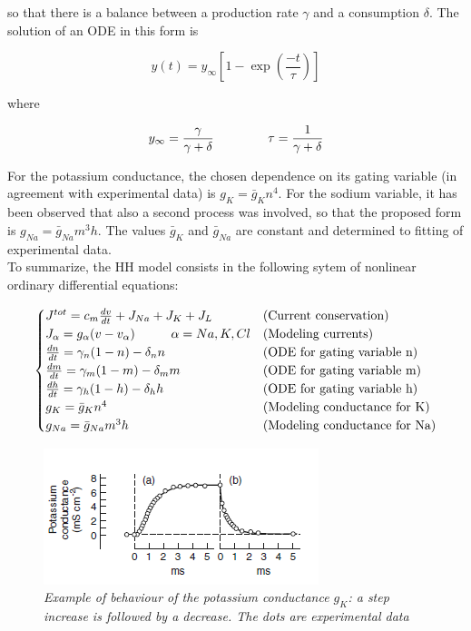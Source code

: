 \documentclass[a4paper]{article}
\begin{document}
	so that there is a balance between a production rate $\gamma$ and a consumption $\delta$. The solution of an ODE in this form is
	
	\begin{equation}
	y(t) = y_\infty \left[1 - \exp\left(\frac{-t}{\tau}\right)\right]
	\end{equation}
	
	where
	
	\begin{equation}
	y_\infty = \frac{\gamma}{\gamma + \delta} \hspace{1.5cm} \tau = \frac{1}{\gamma + \delta}
	\end{equation}
	
	For the potassium conductance, the chosen dependence on its gating variable (in agreement with experimental data) is $ g_K = \bar{g}_K n^4$. For the sodium variable, it has been observed that also a second process was involved, so that the proposed form is  $ g_{Na} = \bar{g}_{Na} m^3h$. The values $\bar{g}_K$ and $\bar{g}_{Na}$ are constant and determined to fitting of experimental data.\\
	To summarize, the HH model consists in the following sytem of nonlinear ordinary differential equations:
	
	\begin{equation}
		\begin{cases}
		J^{tot} = c_m \frac{d v}{d t} + J_{Na} + J_K +J_L  & \text{(Current conservation)}\\
		J_\alpha = g_\alpha (v-v_\alpha) \hspace{1 cm}  \alpha = Na,K,Cl & \text{(Modeling currents)}\\
		\frac{dn}{dt} = \gamma_n(1-n) - \delta_n n & \text{(ODE for gating variable n)} \\
		\frac{dm}{dt} = \gamma_m(1-m) - \delta_m m & \text{(ODE for gating variable m)}\\
		\frac{dh}{dt} = \gamma_h(1-h) - \delta_h h & \text{(ODE for gating variable h)}\\
		 g_K = \bar{g}_K n^4 & \text{(Modeling conductance for K)}\\
		 g_{Na} = \bar{g}_{Na} m^3h  & \text{(Modeling conductance for Na)}
		
		\end{cases}
	\end{equation}
	
	\begin{figure}[H]
		\begin{center}
			\includegraphics[scale=1.1]{gk.png} 
		\end{center} 
		\caption{\textit{Example of behaviour of the potassium conductance $g_K$: a step increase is followed by a decrease. The dots are experimental data}}
		
	\end{figure}
\end{document}
